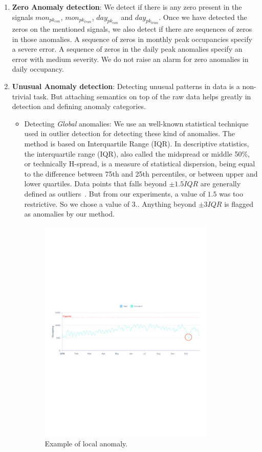 \documentclass[10pt]{sigplanconf}
\begin{document}
\begin{enumerate}
\item \textbf{Zero Anomaly detection}:  We detect if there is any zero present in the signals $mon_{pk_{con}}$, $mon_{pk_{tran}}$, $day_{pk_{con}}$ and $day_{pk_{tran}}$.  Once we have detected the zeros on the mentioned signals, we also detect if there are sequences of zeros in those anomalies.  A sequence of zeros in monthly peak occupancies specify a severe error.  A sequence of zeros in the daily peak anomalies specify an error with medium severity.  We do not raise an alarm for zero anomalies in daily occupancy.

\item \textbf{Unusual Anomaly detection}:  Detecting unusual patterns in data is a non-trivial task.  But attaching semantics on top of the raw data helps greatly in detection and defining anomaly categories.

\begin{itemize}
\item Detecting \textit{Global} anomalies:  We use an well-known statistical technique used in outlier detection for detecting these kind of anomalies.  The method is based on Interquartile Range (IQR).  In descriptive statistics, the interquartile range (IQR), also called the midspread or middle 50\%, or technically H-spread, is a measure of statistical dispersion, being equal to the difference between 75th and 25th percentiles, or between upper and lower quartiles.  Data points that falls beyond $\pm 1.5 \dot IQR$ are generally defined as outliers~\cite{navidi2006statistics}.  But from our experiments, a value of $1.5$ was too restrictive.  So we chose a value of $3$.. Anything beyond $\pm 3 \dot IQR$ is flagged as anomalies by our method.

\begin{figure}[h]
\centering
\includegraphics[width=8.4cm]{./figures/local_anomaly.pdf}
\caption{Example of local anomaly.}
\label{fig:local_anomaly}
\end{figure}


\end{itemize}
\end{enumerate}
\end{document}
